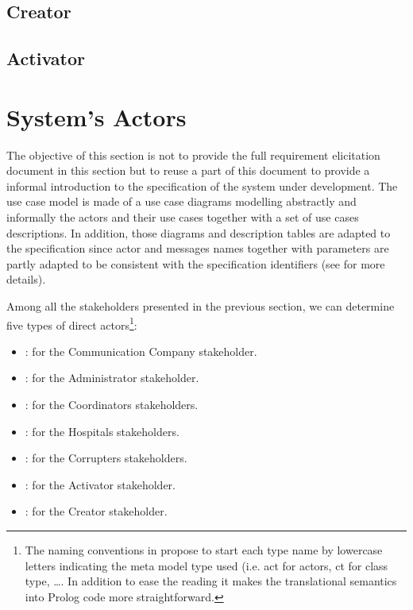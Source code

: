 \subsection{Creator}


\subsection{Activator}


\newpage

\section{System's Actors}
\label{sec:lu.uni.lassy.excalibur.examples.icrash-gendescr-actors}


The objective of this section is not to provide the full requirement elicitation document in this section but to reuse a part of this document to provide a informal introduction to the \msrmessir specification of the system under development. The use case model is made of a use case diagrams modelling abstractly and informally the actors and their use cases together with a set of use cases descriptions. 
In addition, those diagrams and description tables are adapted to the \msrmessir specification since actor and messages names together with parameters are partly adapted to be consistent with the specification identifiers (see \cite{messirbook} for more details). 

Among all the stakeholders presented in the previous section, we can determine five types of \glspl{direct actor}\footnote{The naming conventions in \msrmessir propose to start each type name by lowercase letters indicating the meta model type used (i.e. act for actors, ct for class type, \ldots. In addition to ease the reading it makes the translational semantics into Prolog code more straightforward.}: 
\begin{itemize}
  \item {}: for the Communication Company stakeholder.
  \item {}: for the Administrator stakeholder.
  \item {}: for the Coordinators stakeholders.
  \item {}: for the Hospitals stakeholders.
  \item {}: for the Corrupters stakeholders.
  \item {}: for the Activator stakeholder.
  \item {}: for the Creator stakeholder.
\end{itemize}
 
